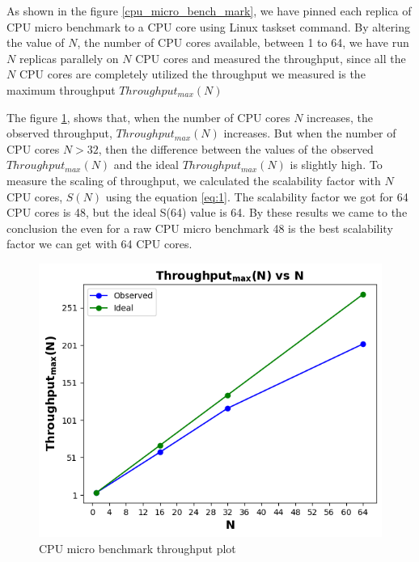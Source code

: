 \documentclass[sigconf]{acmart}
\begin{document}
As shown in the figure \ref{cpu_micro_bench_mark}, we have pinned each replica of CPU micro benchmark to a CPU core using Linux taskset command. By altering the value of $N$, the number of CPU cores available, between 1 to 64, we have run $N$ replicas parallely on $N$ CPU cores and measured the throughput, since all the $N$ CPU cores are completely utilized the throughput we measured is the maximum throughput $Throughput_{max}(N)$

The figure \ref{cpu_micro_bench_mark_throughput}, shows that, when the number of CPU cores $N$ increases, the observed throughput, $Throughput_{max}(N)$ increases. But when the number of CPU cores $N>32$, then the difference between the values of the observed  $Throughput_{max}(N)$  and the ideal $Throughput_{max}(N)$ is slightly high. To measure the scaling of throughput, we calculated the scalability factor with $N$ CPU cores, $S(N)$ using the equation \ref{eq:1}. The scalability factor we got for 64 CPU cores is 48, but the ideal  S(64) value is 64. By these results we came to the conclusion the even for a raw CPU micro benchmark 48 is the best scalability factor we can get with 64 CPU cores.


\begin{figure}[!htb]
  \centering
  \includegraphics[width=\linewidth]{Pictures/cpu_micro_benchmark_throughput.png}
  \caption{CPU micro benchmark throughput plot}
  \label{cpu_micro_bench_mark_throughput}
\end{figure}
\end{document}
